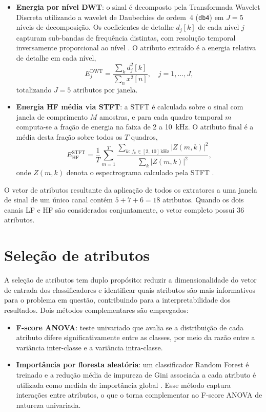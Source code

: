 \begin{itemize}
    \item \textbf{Energia por nível DWT}: o sinal é decomposto pela Transformada Wavelet Discreta utilizando a wavelet de Daubechies de ordem~4 (\texttt{db4}) em $J = 5$ níveis de decomposição. Os coeficientes de detalhe $d_j[k]$ de cada nível $j$ capturam sub-bandas de frequência distintas, com resolução temporal inversamente proporcional ao nível \cite{Elkalashy2007, 6}. O atributo extraído é a energia relativa de detalhe em cada nível,
    \begin{equation}
        E_j^{\mathrm{DWT}} = \frac{\sum_k d_j^2[k]}{\sum_{n} x^2[n]},\quad j = 1, \ldots, J,
        \label{eq:dwt_energy}
    \end{equation}
    totalizando $J = 5$ atributos por janela.

    \item \textbf{Energia HF média via STFT}: a STFT é calculada sobre o sinal com janela de comprimento $M$ amostras, e para cada quadro temporal $m$ computa-se a fração de energia na faixa de 2 a 10~kHz. O atributo final é a média desta fração sobre todos os $T$ quadros,
    \begin{equation}
        E_{\mathrm{HF}}^{\mathrm{STFT}} = \frac{1}{T} \sum_{m=1}^{T} \frac{\displaystyle\sum_{k:\, f_k \in [2,\,10]\,\mathrm{kHz}} |Z(m,k)|^2}{\displaystyle\sum_{k} |Z(m,k)|^2},
        \label{eq:stft_hf}
    \end{equation}
    onde $Z(m,k)$ denota o espectrograma calculado pela STFT \cite{7}.
\end{itemize}

O vetor de atributos resultante da aplicação de todos os extratores a uma janela de sinal de um único canal contém $5 + 7 + 6 = 18$ atributos. Quando os dois canais LF e HF são considerados conjuntamente, o vetor completo possui 36 atributos.

\section{Seleção de atributos}\label{sec:met_selecao}

A seleção de atributos tem duplo propósito: reduzir a dimensionalidade do vetor de entrada dos classificadores e identificar quais atributos são mais informativos para o problema em questão, contribuindo para a interpretabilidade dos resultados. Dois métodos complementares são empregados:

\begin{itemize}
    \item \textbf{F-score ANOVA}: teste univariado que avalia se a distribuição de cada atributo difere significativamente entre as classes, por meio da razão entre a variância inter-classe e a variância intra-classe.

    \item \textbf{Importância por floresta aleatória}: um classificador Random Forest é treinado e a redução média de impureza de Gini associada a cada atributo é utilizada como medida de importância global \cite{9}. Esse método captura interações entre atributos, o que o torna complementar ao F-score ANOVA de natureza univariada.
\end{itemize}

